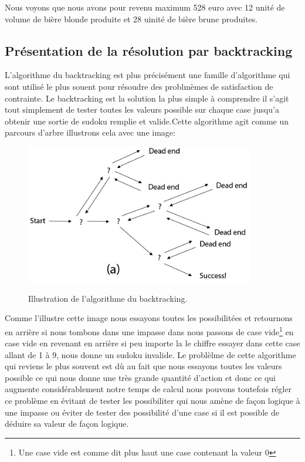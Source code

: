 Nous voyons que nous avons pour revenu maximum 528 euro avec 12 unité de volume de bière blonde produite et 28 uinité de bière brune produites.

\subsection{Présentation de la résolution par backtracking}
L'algorithme du backtracking est plus précisément une famille d'algorithme qui sont utilisé le plus souent pour résoudre des problmèmes de satisfaction de contrainte.
Le backtracking est la solution la plus simple à comprendre il s'agit tout simplement de tester toutes les valeurs possible sur chaque case jusqu'a obtenir une sortie de sudoku remplie et valide.Cette algorithme agit comme un parcours d'arbre illustrons cela avec une image:\newline

\begin{figure}[h]
  \begin{center}
\includegraphics[width=10cm]{./images/backtracking.png}\label{Backtracking}
\caption{Illustration de l'algorithme du backtracking.}
\end{center}
\end{figure}

Comme l'illustre cette image nous essayons toutes les possibilitées et retournons en arrière si nous tombons dans une impasse dans nous passons de case vide\footnote{\label{vide}Une case vide est comme dit plus haut une case contenant la valeur 0} en case vide en revenant en arrière si peu importe la le chiffre essayer dans cette case allant de 1 à 9, nous donne un sudoku invalide. Le problèlme de cette algorithme qui reviens le plus souvent est dù au fait que nous essayons toutes les valeurs possible ce qui nous donne une très grande quantité d'action et donc ce qui augmente considérablement notre temps de calcul nous pouvons toutefois régler ce problème en évitant de tester les possibiliter qui nous amène de façon logique à une impasse ou éviter de tester des possibilité d'une case si il est possible de déduire sa valeur de façon logique.
